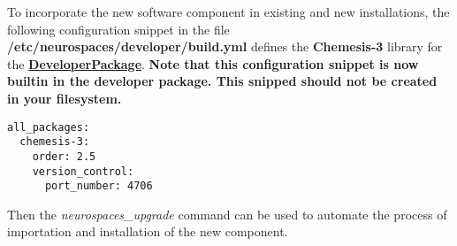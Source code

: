 \documentclass[12pt]{article}
\begin{document}
To incorporate the new software component in existing and new
installations, the following configuration snippet in the file {\bf
  /etc/neurospaces/developer/build.yml} defines the {\bf Chemesis-3}
library for the \href{../developer-package/developer-package.tex}{\bf
  DeveloperPackage}.  {\bf Note that this configuration snippet is now
  builtin in the developer package.  This snipped should not be
  created in your filesystem.}
\begin{verbatim}
all_packages:
  chemesis-3:
    order: 2.5
    version_control:
      port_number: 4706
\end{verbatim}
Then the {\it neurospaces\_upgrade} command can be used to automate
the process of importation and installation of the new component.





\end{document}
